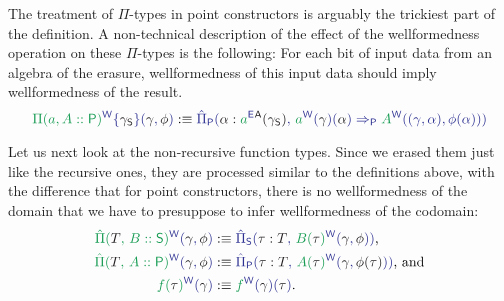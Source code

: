 \begin{defn}
The treatment of $\Pi$-types in point constructors is arguably the trickiest part
of the definition.
A non-technical description of the effect of the wellformedness operation on
these $\Pi$-types is the following:
For each bit of input data from an algebra of the erasure, wellformedness of this
input data should imply wellformedness of the result.
\begin{equation*}
\tqm{\grm{\Pi(a, A :: \Pc)}^\WW\{\blm{\gamma_\Sc}\}(\blgamma, \blphi)}
  :\equiv \tqm{\ExtPiP{\blalpha : \tqm{\grm{a}^\EE}^\CC(\gamma_\Sc)}
    { \grm{a}^\WW(\blgamma)(\blalpha)
      \Rightarrow_\Pc \grm{A}^\WW((\gamma, \alpha), \phi(\alpha))}}
\end{equation*}

Let us next look at the non-recursive function types.
Since we erased them just like the recursive ones, they are processed similar to
the definitions above, with the difference that for point constructors, there is
no wellformedness of the domain that we have to presuppose to infer wellformedness
of the codomain:
\begin{align*}
\tqm{\grm{\ExtPi{T}{B :: \Sc}}^\WW(\blgamma, \blphi)}
  &:\equiv \tqm{\ExtPiS{\tau : T}{\grm{B(\bltau)}^\WW(\blgamma, \blphi)}} \text{,} \\
\tqm{\grm{\ExtPi{T}{A :: \Pc}}^\WW(\blgamma, \blphi)}
  &:\equiv \tqm{\ExtPiP{\tau : T}{\grm{A(\bltau)}^\WW(\blgamma, \blm{\phi(\tau)})}}
  \text{, and} \\
\tqm{\grm{f(\bltau)}^\WW(\blgamma)}
  &:\equiv \tqm{\grm{f}^\WW(\blgamma)(\bltau) } \text{.}
\end{align*}


\end{defn}
